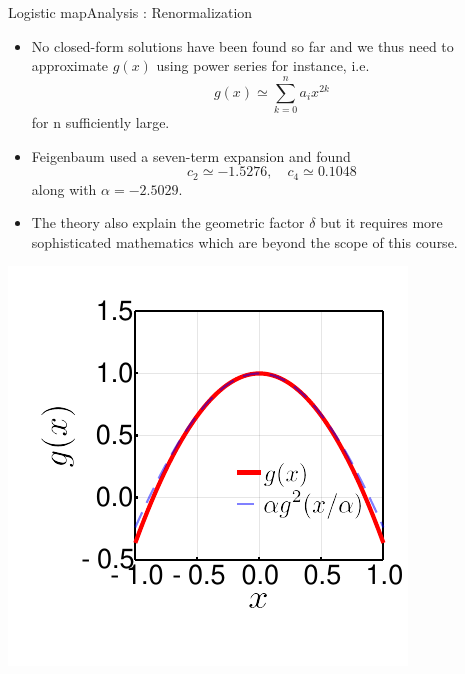 \documentclass[usenames,dvipsnames,svgnames,10pt,aspectratio=169]{beamer}
\begin{document}
\begin{frame}[t, c]{Logistic map}{Analysis : Renormalization}
	\begin{minipage}{.68\textwidth}
		\begin{itemize}
			\item No closed-form solutions have been found so far and we thus need to approximate \(g(x)\) using power series for instance, i.e.\
			\[
				g(x) \simeq \sum_{k=0}^{n} a_i x^{2k}
			\]
			for n sufficiently large.

			\item Feigenbaum used a seven-term expansion and found
			\[
				c_2 \simeq -1.5276, \quad c_4 \simeq 0.1048
			\]
			along with \( \alpha = -2.5029 \).

			\medskip

			\item The theory also explain the geometric factor \( \delta \) but it requires more sophisticated mathematics which are beyond the scope of this course.
		\end{itemize}
	\end{minipage}%
	\hfill
	\begin{minipage}{.28\textwidth}
		\centering
		\includegraphics[width=\textwidth]{quadratic_functional_equation}
	\end{minipage}

	\vspace{1cm}
\end{frame}
\end{document}
